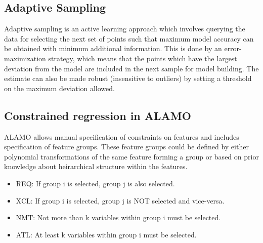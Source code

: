 \documentclass[a4paper,12pt]{article}
\begin{document}
\subsection{Adaptive Sampling}
Adaptive sampling is an active learning \cite{angluin1988queries,settles.tr09} approach which involves querying the data for selecting the next set of points such that maximum model accuracy can be obtained with minimum additional information. This is done by an error-maximization strategy, which means that the points which have the largest deviation from the model are included in the next sample for model building. The estimate can also be made robust (insensitive to outliers) by setting a threshold on the maximum deviation allowed.   
\subsection{Constrained regression in ALAMO}
ALAMO allows manual specification of constraints on features and includes specification of feature groups. These feature groups could be defined by either polynomial transformations of the same feature forming a group or based on prior knowledge about heirarchical structure within the features. 
\begin{itemize}
    \item REQ: If group i is selected, group j is also selected.
    \item XCL: If group i is selected, group j is NOT selected and vice-versa.
    \item NMT: Not more than k variables within group i must be selected.
    \item ATL: At least k variables within group i must be selected.
\end{itemize}


\newpage
\end{document}
